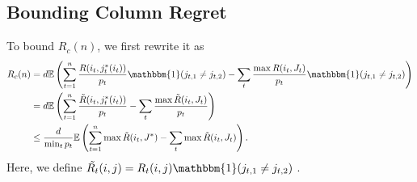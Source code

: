 


\subsection{Bounding Column Regret}

To bound $R_c(n)$, we first rewrite it as 
\begin{align*}
R_c(n) &=  d \E \left( \sum_{t = 1}^{n} \frac{R(i_t,j^*_t(i_t))}{p_t} \mathbbm{1}(j_{t,1} \neq j_{t,2}) - \sum_{t} \frac{\max R(i_t,J_t)}{p_t} \mathbbm{1}(j_{t,1} \neq j_{t,2})  \right) \\
&=  d \E \left( \sum_{t = 1}^{n} \frac{\tilde{R}(i_t,j^*_t(i_t))}{p_t}  - \sum_{t} \frac{\max \tilde{R}(i_t,J_t)}{p_t}   \right) \\
&\leq  \frac{d}{\min_t p_t} \E \left( \sum_{t = 1}^{n} \max \tilde{R}(i_t,J^*)  - \sum_{t} \max \tilde{R}(i_t,J_t)   \right).
\end{align*}
Here, we define $ \tilde{R_t}(i,j) = R_t(i,j)\mathbbm{1}(j_{t,1} \neq j_{t,2})$ .
%
%
%
